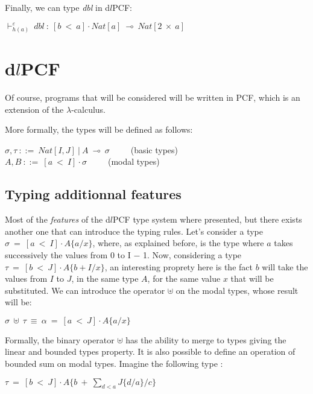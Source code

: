 \documentclass[a4paper,12pt]{report}
\begin{document}
Finally, we can type \emph{dbl} in d$l$PCF:

\begin{center}
$\vdash^{\varepsilon}_{h(a)}~dbl~:~[b~<~a] \cdot Nat[a]~\multimap~Nat[2~\times~a]$
\end{center}

\section{d$l$PCF}


Of course, programs that will be considered will be written in PCF, which is an
extension of the $\lambda$-calculus. 

More formally, the types will be defined as follows:

\begin{center}
  $\sigma, \tau~::=~Nat[I,J]~|~A~\multimap~\sigma$~~~~~(basic types) \\
  $A, B~::=~[a~<~I] \cdot \sigma$~~~~~(modal types)
\end{center}

\subsection{Typing additionnal features}


Most of the \emph{features} of the d$l$PCF type system where presented, but
there exists another one that can introduce the typing rules. Let's consider a
type $\sigma~=~[a~<~I] \cdot A\{a/x\}$, where, as explained before, is the type
where $a$ takes successively the values from 0 to I $-$ 1. Now, considering a
type $\tau~=~[b~<~J] \cdot A\{b+I/x\}$, an interesting proprety here is the fact
$b$ will take the values from $I$ to $J$, in the same type $A$, for the same value
$x$ that will be substituted. We can introduce the operator $\uplus$ on the
modal types, whose result will be:

\begin{center}
$\sigma~\uplus~\tau~\equiv~\alpha~=~[a~<~J] \cdot A\{a/x\}$
\end{center}

Formally, the binary operator $\uplus$ has the ability to merge to types giving
the linear and bounded types property. It is also possible to define an
operation of bounded sum on modal types. Imagine the following type :

\begin{center}
  $\tau~=~[b~<~J] \cdot A\{b~+~\sum_{d<a}J\{d/a\}/c\}$
\end{center}
\end{document}
